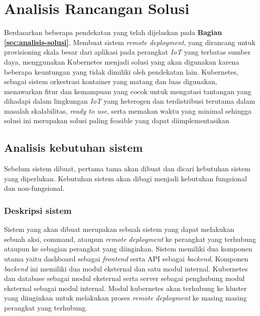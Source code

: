 \section{Analisis Rancangan Solusi}
\label{sec:analisis-rancangan-solusi}

Berdasarkan beberapa pendekatan yang telah dijelaskan pada \textbf{Bagian \ref{sec:analisis-solusi}}, Membuat sistem \textit{remote deployment}, yang dirancang untuk provisioning skala besar dari aplikasi pada perangkat \textit{IoT} yang terbatas sumber daya, menggunakan Kubernetes menjadi solusi yang akan digunakan karena beberapa keuntungan yang tidak dimiliki oleh pendekatan lain. Kubernetes, sebagai sistem orkestrasi kontainer yang matang dan luas digunakan, menawarkan fitur dan kemampuan yang cocok untuk mengatasi tantangan yang dihadapi dalam lingkungan \textit{IoT} yang heterogen dan terdistribusi terutama dalam masalah skalabilitas, \textit{ready to use}, serta memakan waktu yang minimal sehingga solusi ini merupakan solusi paling feasible yang dapat diimplementasikan

\subsection{Analisis kebutuhan sistem}

Sebelum sistem dibuat, pertama tama akan dibuat dan dicari kebutuhan sistem yang diperlukan. Kebutuhan sistem akan dibagi menjadi kebutuhan fungsional dan non-fungsional.

\subsubsection{Deskripsi sistem}
Sistem yang akan dibuat merupakan sebuah sistem yang dapat melakukan sebuah aksi, command, ataupun \textit{remote deployment} ke perangkat yang terhubung ataupun ke sebagian perangkat yang diinginkan. Sistem memiliki dua komponen utama yaitu dashboard sebagai \textit{frontend} serta API sebagai \textit{backend}. Komponen \textit{backend} ini memiliki dua modul eksternal dan satu modul internal. Kubernetes dan database sebagai modul eksternal serta server sebagai penghubung modul eksternal sebagai modul internal. Modul kubernetes akan terhubung ke kluster yang diinginkan untuk melakukan proses \textit{remote deployment} ke masing masing perangkat yang terhubung.

